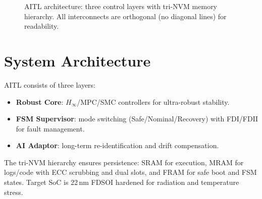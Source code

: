 \documentclass[conference]{IEEEtran}
\begin{document}
\begin{figure*}[!t]
\centering
{}
\caption{AITL architecture: three control layers with tri-NVM memory hierarchy. All interconnects are orthogonal (no diagonal lines) for readability.}
\label{fig:arch}
\end{figure*}

\section{System Architecture}
AITL consists of three layers:
\begin{itemize}
  \item \textbf{Robust Core}: $H_\infty$/MPC/SMC controllers for ultra-robust stability.
  \item \textbf{FSM Supervisor}: mode switching (Safe/Nominal/Recovery) with FDI/FDII for fault management.
  \item \textbf{AI Adaptor}: long-term re-identification and drift compensation.
\end{itemize}
The tri-NVM hierarchy ensures persistence: SRAM for execution, MRAM for logs/code with ECC scrubbing and dual slots, and FRAM for safe boot and FSM states. Target SoC is 22\,nm FD\!SOI hardened for radiation and temperature stress.
\end{document}
